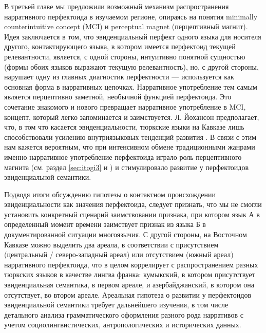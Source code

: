 \par В третьей главе мы предложили возможный механизм распространения нарративного перфектоида в изучаемом регионе, опираясь на понятия minimally counterintuitive concept (MCI) и perceptual magnet (перцептивный магнит). Идея заключается в том, что эвиденциальный перфект одного языка для носителя другого, контактирующего языка, в котором имеется перфектоид текущей релевантности, является, с одной стороны, интуитивно понятной сущностью (формы обоих языков выражают текущую релевантность), но, с другой стороны, нарушает одну из главных диагностик перфектности --- используется как основная форма в нарративных цепочках. Нарративное употребление тем самым является перцептивно заметной, необычной функцией перфектоида. Это сочетание знакомого и нового превращает нарративное употребление в MCI, концепт, который легко запоминается и заимствуется. Л. Йохансон предполагает, что, в том что касается эвиденциальности, тюркские языки на Кавказе лишь способствовали усилению внутриязыковых тенденций развития \citep{johanson2006}. В связи с этим нам кажется вероятным, что при интенсивном обмене традиционными жанрами именно нарративное употребление перфектоида играло роль перцептивного магнита (см. раздел \ref{sec:itogi3} и \citep{blevins2017}) и стимулировало развитие у перфектоидов эвиденциальной семантики.
\par Подводя итоги обсуждению гипотезы о контактном происхождении эвиденциальности как значения перфектоида, следует признать, что мы не смогли установить конкретный сценарий заимствовании признака, при котором язык А в определенный момент времени заимствует признак из языка Б в документированной ситуации многоязычия. С другой стороны, на Восточном Кавказе можно выделить два ареала, в соответствии с присутствием (центральный / северо-западный ареал) или отсутствием (южный ареал) нарративного перфектоида, что в целом коррелирует с распространением разных тюркских языков в качестве лингва франка: кумыкский, в котором присутствует эвиденциальная семантика, в первом ареале, и азербайджанский, в котором она отсутствует, во втором ареале. Ареальная гипотеза о развитии у перфектоидов эвиденциальной семантики требует дальнейшего изучения, в том числе детального анализа грамматического оформления разного рода нарративов с учетом социолингвистических, антропологических и исторических данных.
